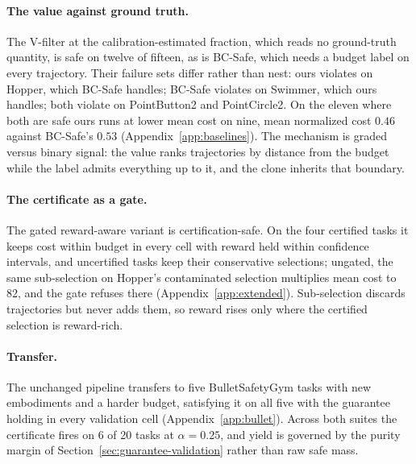\documentclass{article} %
\begin{document}
\paragraph{The value against ground truth.} The V-filter at the calibration-estimated fraction, which reads no ground-truth quantity, is safe on twelve of fifteen, as is BC-Safe, which needs a budget label on every trajectory. Their failure sets differ rather than nest: ours violates on Hopper, which BC-Safe handles; BC-Safe violates on Swimmer, which ours handles; both violate on PointButton2 and PointCircle2. On the eleven where both are safe ours runs at lower mean cost on nine, mean normalized cost $0.46$ against BC-Safe's $0.53$ (Appendix~\ref{app:baselines}). The mechanism is graded versus binary signal: the value ranks trajectories by distance from the budget while the label admits everything up to it, and the clone inherits that boundary.

\paragraph{The certificate as a gate.} The gated reward-aware variant is certification-safe. On the four certified tasks it keeps cost within budget in every cell with reward held within confidence intervals, and uncertified tasks keep their conservative selections; ungated, the same sub-selection on Hopper's contaminated selection multiplies mean cost to 82, and the gate refuses there (Appendix~\ref{app:extended}). Sub-selection discards trajectories but never adds them, so reward rises only where the certified selection is reward-rich.

\paragraph{Transfer.} The unchanged pipeline transfers to five BulletSafetyGym tasks with new embodiments and a harder budget, satisfying it on all five with the guarantee holding in every validation cell (Appendix~\ref{app:bullet}). Across both suites the certificate fires on 6 of 20 tasks at $\alpha = 0.25$, and yield is governed by the purity margin of Section~\ref{sec:guarantee-validation} rather than raw safe mass.
\end{document}
